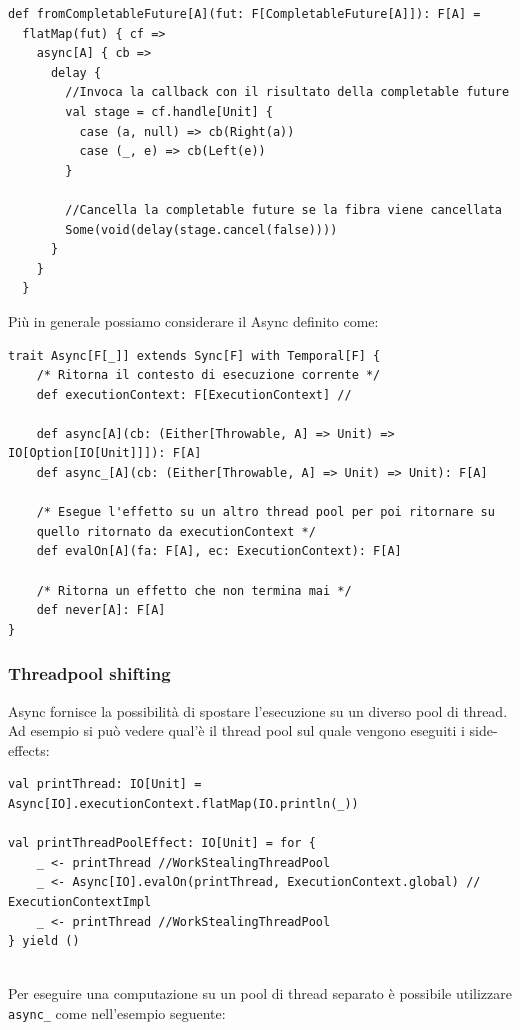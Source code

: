 \begin{verbatim}
def fromCompletableFuture[A](fut: F[CompletableFuture[A]]): F[A] =
  flatMap(fut) { cf =>
    async[A] { cb =>
      delay {
        //Invoca la callback con il risultato della completable future
        val stage = cf.handle[Unit] {
          case (a, null) => cb(Right(a))
          case (_, e) => cb(Left(e))
        }

        //Cancella la completable future se la fibra viene cancellata
        Some(void(delay(stage.cancel(false))))
      }
    }
  }
\end{verbatim}

Più in generale possiamo considerare il Async definito come:
\begin{verbatim}
trait Async[F[_]] extends Sync[F] with Temporal[F] {
    /* Ritorna il contesto di esecuzione corrente */
    def executionContext: F[ExecutionContext] //
    
    def async[A](cb: (Either[Throwable, A] => Unit) => IO[Option[IO[Unit]]]): F[A]
    def async_[A](cb: (Either[Throwable, A] => Unit) => Unit): F[A]
    
    /* Esegue l'effetto su un altro thread pool per poi ritornare su
    quello ritornato da executionContext */
    def evalOn[A](fa: F[A], ec: ExecutionContext): F[A]
    
    /* Ritorna un effetto che non termina mai */
    def never[A]: F[A]
}
\end{verbatim}

\subsubsection{Threadpool shifting}
Async fornisce la possibilità di spostare l’esecuzione su un diverso pool di thread. Ad esempio si può vedere qual’è il thread pool sul quale vengono eseguiti i side-effects:
\begin{verbatim}
val printThread: IO[Unit] = Async[IO].executionContext.flatMap(IO.println(_))

val printThreadPoolEffect: IO[Unit] = for {
    _ <- printThread //WorkStealingThreadPool
    _ <- Async[IO].evalOn(printThread, ExecutionContext.global) // ExecutionContextImpl
    _ <- printThread //WorkStealingThreadPool
} yield ()
    
\end{verbatim}

Per eseguire una computazione su un pool di thread separato è possibile utilizzare \texttt{async\_} come nell'esempio seguente:

